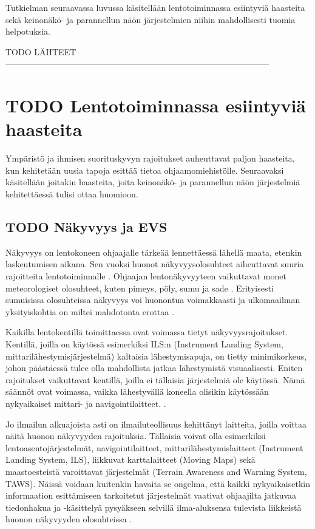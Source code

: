 \documentclass[utf8,bachelor,manualbib]{gradu3}
\begin{document}
Tutkielman seuraavassa luvussa käsitellään lentotoiminnassa esiintyviä haasteita sekä keinonäkö- ja parannellun näön järjestelmien niihin mahdollisesti tuomia helpotuksia.

TODO LÄHTEET---------------------------------------------------------------------------------------------
\chapter{TODO Lentotoiminnassa esiintyviä haasteita}

Ympäristö ja ihmisen suorituskyvyn rajoitukset auheuttavat paljon haasteita, kun kehitetään uusia tapoja 
esittää tietoa ohjaamomiehistölle. Seuraavaksi käsitellään joitakin haasteita, joita keinonäkö- ja parannellun näön järjestelmiä kehitettäessä tulisi ottaa huomioon.

\section{TODO Näkyvyys ja EVS}

Näkyvyys on lentokoneen ohjaajalle tärkeää lennettäessä lähellä maata, etenkin laskeutumisen aikana. Sen vuoksi huonot näkyvyysolosuhteet aiheuttavat suuria rajoitteita lentotoiminnalle \citep{mollersachs1994}. Ohjaajan lentonäkyvyyteen vaikuttavat monet meteorologiset olosuhteet, kuten pimeys, pöly, sumu ja sade \citep{wickensalexander2009}. Erityisesti sumuisissa olosuhteissa näkyvyys voi huonontua voimakkaasti ja ulkomaailman yksityiskohtia on miltei mahdotonta erottaa \citep{beiergemperlein2004}.

Kaikilla lentokentillä toimittaessa ovat voimassa tietyt näkyvyysrajoitukset. Kentillä, joilla on käytössä esimerkiksi ILS:n (Instrument Landing System, mittarilähestymisjärjestelmä) kaltaisia lähestymisapuja, on tietty minimikorkeus, johon päästäessä tulee olla mahdollista jatkaa lähestymistä visuaalisesti. Eniten rajoitukset vaikuttavat kentillä, joilla ei tällaisia järjestelmiä ole käytössä. Nämä säännöt ovat voimassa, vaikka lähestyvällä koneella olisikin käytössään nykyaikaiset mittari- ja navigointilaitteet. \cite{mollersachs1994}.

Jo ilmailun alkuajoista asti on ilmailuteollisuus kehittänyt laitteita, joilla voittaa näitä huonon näkyvyyden rajoituksia. Tällaisia voivat olla esimerkiksi lentoasentojärjestelmät, navigointilaitteet, mittarilähestymislaitteet (Instrument Landing System, ILS), liikkuvat karttalaitteet (Moving Maps) sekä maastoesteistä varoittavat järjestelmät (Terrain Awareness and Warning System, TAWS). Näissä voidaan kuitenkin havaita se ongelma, että kaikki nykyaikaisetkin informaation esittämiseen tarkoitetut järjestelmät vaativat ohjaajilta jatkuvaa tiedonhakua ja -käsittelyä pysyäkseen selvillä ilma-aluksensa tulevista liikkeistä huonon näkyvyyden olosuhteissa \citep {prinzel2004}.
\end{document}
